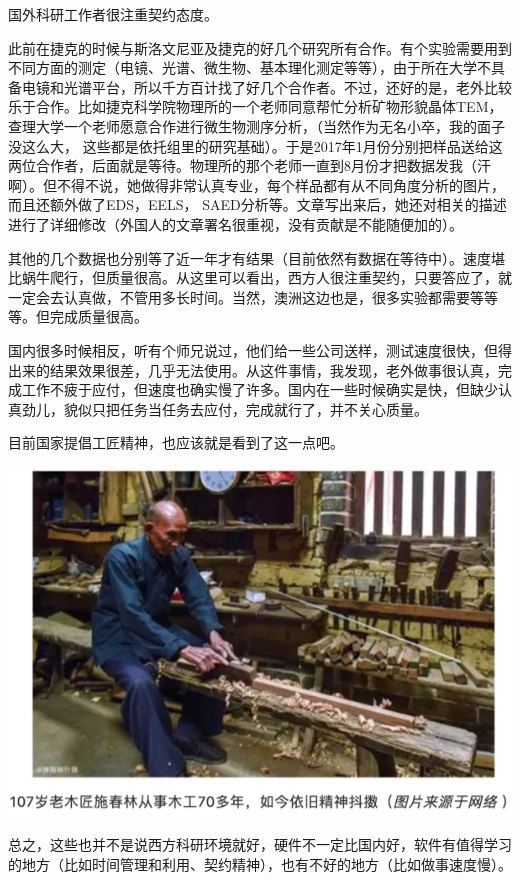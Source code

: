 \documentclass[
]{book}
\begin{document}
国外科研工作者很注重契约态度。

此前在捷克的时候与斯洛文尼亚及捷克的好几个研究所有合作。有个实验需要用到不同方面的测定（电镜、光谱、微生物、基本理化测定等等），由于所在大学不具备电镜和光谱平台，所以千方百计找了好几个合作者。不过，还好的是，老外比较乐于合作。比如捷克科学院物理所的一个老师同意帮忙分析矿物形貌晶体TEM，查理大学一个老师愿意合作进行微生物测序分析，（当然作为无名小卒，我的面子没这么大， 这些都是依托组里的研究基础）。于是2017年1月份分别把样品送给这两位合作者，后面就是等待。物理所的那个老师一直到8月份才把数据发我（汗啊）。但不得不说，她做得非常认真专业，每个样品都有从不同角度分析的图片，而且还额外做了EDS，EELS， SAED分析等。文章写出来后，她还对相关的描述进行了详细修改（外国人的文章署名很重视，没有贡献是不能随便加的）。

其他的几个数据也分别等了近一年才有结果（目前依然有数据在等待中）。速度堪比蜗牛爬行，但质量很高。从这里可以看出，西方人很注重契约，只要答应了，就一定会去认真做，不管用多长时间。当然，澳洲这边也是，很多实验都需要等等等。但完成质量很高。

国内很多时候相反，听有个师兄说过，他们给一些公司送样，测试速度很快，但得出来的结果效果很差，几乎无法使用。从这件事情，我发现，老外做事很认真，完成工作不疲于应付，但速度也确实慢了许多。国内在一些时候确实是快，但缺少认真劲儿，貌似只把任务当任务去应付，完成就行了，并不关心质量。

目前国家提倡工匠精神，也应该就是看到了这一点吧。

\includegraphics[width=8.33in]{images/osre5}

总之，这些也并不是说西方科研环境就好，硬件不一定比国内好，软件有值得学习的地方（比如时间管理和利用、契约精神），也有不好的地方（比如做事速度慢）。
\end{document}
